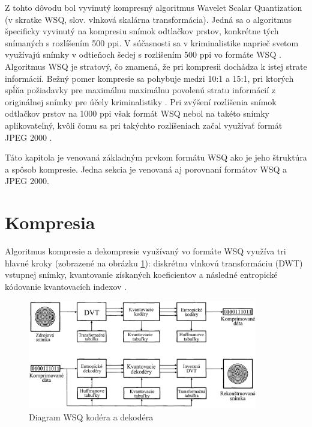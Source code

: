   Z tohto dôvodu bol vyvinutý kompresný algoritmus Wavelet Scalar Quantization (v skratke WSQ, slov. vlnková skalárna transformácia).
  Jedná sa o algoritmus špecificky vyvinutý na kompresiu snímok odtlačkov prstov, konkrétne tých snímaných s rozlíšením 500 ppi. V súčasnosti sa
  v kriminalistike naprieč svetom využívajú snímky v odtieňoch šedej s rozlíšením 500 ppi vo formáte WSQ \cite{Libert}.
  Algoritmus WSQ je stratový, čo znamená, že pri kompresii dochádza k istej strate informácií. Bežný pomer kompresie sa pohybuje medzi 10:1 a 15:1,
  pri ktorých spĺňa požiadavky pre maximálnu maximálnu povolenú stratu informácií z originálnej snímky pre účely kriminalistiky \cite{Handbook}.
  Pri zvýšení rozlíšenia snímok odtlačkov prstov na 1000 ppi však formát WSQ nebol na takéto snímky aplikovateľný, kvôli čomu sa pri takýchto rozlíšeniach
  začal využívať formát JPEG 2000 \cite{Libert}.

  Táto kapitola je venovaná základným prvkom formátu WSQ ako je jeho štruktúra a spôsob kompresie. Jedna sekcia je venovaná aj porovnaní formátov
  WSQ a JPEG 2000.

  \section{Kompresia}
  Algoritmus kompresie a dekompresie využívaný vo formáte WSQ využíva tri hlavné kroky (zobrazené na obrázku \ref{obr:WSQ_diagram}):
  diskrétnu vlnkovú transformáciu (DWT) vstupnej snímky, kvantovanie získaných koeficientov a následné entropické kódovanie kvantovacích indexov \cite{Bradley}.

  \begin{figure}[]
    \centering
    \includegraphics[width=10cm]{obrazky-figures/WSQ_encoder_decoder.png}
    \caption{Diagram WSQ kodéra a dekodéra \cite{Bradley}}
    \label{obr:WSQ_diagram}
  \end{figure}
  
